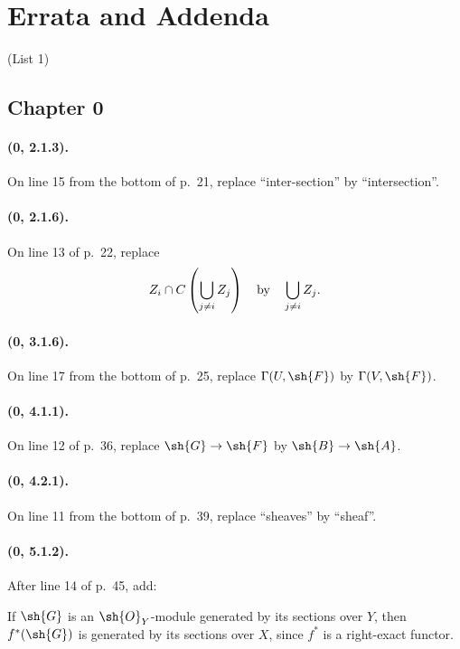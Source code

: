 \clearpage
{}
{}
\section*{Errata and Addenda}
\begin{center}
\large (List 1)
\end{center}

\subsection*{Chapter 0}

\paragraph{(0, 2.1.3).}
On line 15 from the bottom of p.~21, replace ``inter-section'' by
``intersection''.

\paragraph{(0, 2.1.6).}
On line 13 of p.~22, replace
\[
  Z_i\cap C\left(\bigcup_{j\ne i}Z_j\right)
  \quad\hbox{by}\quad
  \bigcup_{j\ne i}Z_j.
\]

\paragraph{(0, 3.1.6).}
On line 17 from the bottom of p.~25, replace
$\Gamma(U,\sh{F})$ by $\Gamma(V,\sh{F})$.

\paragraph{(0, 4.1.1).}
On line 12 of p.~36, replace $\sh{G}\to\sh{F}$ by
$\sh{B}\to\sh{A}$.

\paragraph{(0, 4.2.1).}
On line 11 from the bottom of p.~39, replace ``sheaves'' by ``sheaf''.

\paragraph{(0, 5.1.2).}
After line 14 of p.~45, add:

If $\sh{G}$ is an $\sh{O}_Y$-module generated by its sections over $Y$,
then $f^*(\sh{G})$ is generated by its sections over $X$, since $f^*$ is a
right-exact functor.

